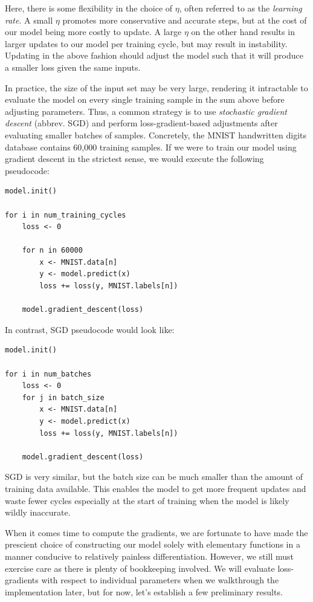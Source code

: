 \documentclass[
]{article}
\begin{document}
Here, there is some flexibility in the choice of \(\eta\), often
referred to as the \emph{learning rate}. A small \(\eta\) promotes more
conservative and accurate steps, but at the cost of our model being more
costly to update. A large \(\eta\) on the other hand results in larger
updates to our model per training cycle, but may result in instability.
Updating in the above fashion should adjust the model such that it will
produce a smaller loss given the same inputs.

In practice, the size of the input set may be very large, rendering it
intractable to evaluate the model on every single training sample in the
sum above before adjusting parameters. Thus, a common strategy is to use
\emph{stochastic gradient descent} (abbrev. SGD) and perform
loss-gradient-based adjustments after evaluating smaller batches of
samples. Concretely, the MNIST handwritten digits database contains
60,000 training samples. If we were to train our model using gradient
descent in the strictest sense, we would execute the following
pseudocode:

\begin{verbatim}
model.init()

for i in num_training_cycles
    loss <- 0

    for n in 60000
        x <- MNIST.data[n]
        y <- model.predict(x)
        loss += loss(y, MNIST.labels[n])
    
    model.gradient_descent(loss)
\end{verbatim}

In contrast, SGD pseudocode would look like:

\begin{verbatim}
model.init()

for i in num_batches
    loss <- 0
    for j in batch_size
        x <- MNIST.data[n]
        y <- model.predict(x)
        loss += loss(y, MNIST.labels[n])
    
    model.gradient_descent(loss)
\end{verbatim}

SGD is very similar, but the batch size can be much smaller than the
amount of training data available. This enables the model to get more
frequent updates and waste fewer cycles especially at the start of
training when the model is likely wildly inaccurate.

When it comes time to compute the gradients, we are fortunate to have
made the prescient choice of constructing our model solely with
elementary functions in a manner conducive to relatively painless
differentiation. However, we still must exercise care as there is plenty
of bookkeeping involved. We will evaluate loss-gradients with respect to
individual parameters when we walkthrough the implementation later, but
for now, let's establish a few preliminary results.
\end{document}
